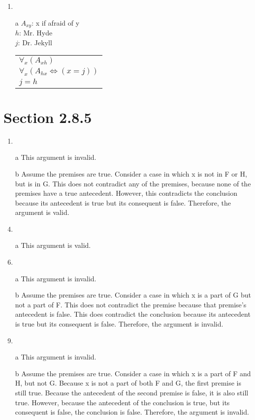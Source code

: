 \documentclass{article}
\begin{document}
\begin{enumerate}
		\item
		\item[a]
			$A_{xy}$: x if afraid of y\\
			$h$: Mr. Hyde\\
			$j$: Dr. Jekyll\\
			\begin{tabular}{l}
				$\forall _x (A_{xh})$\\
				$\forall _x (A_{hx} \iff (x = j))$\\ \hline
				$j = h$
			\end{tabular}

	\end{enumerate}
	\section{Section 2.8.5}
	\begin{enumerate}
		\item
		\item[a] This argument is invalid.
		\item[b] Assume the premises are true. Consider a case in which x is not in F or H, but is in G. This does not contradict any of the premises, because none of the premises have a true antecedent. However, this contradicts the conclusion because its antecedent is true but its consequent is false. Therefore, the argument is valid.
		\item
		\item[a] This argument is valid.
		\item
		\item[a] This argument is invalid.
		\item[b] Assume the premises are true. Consider a case in which x is a part of G but not a part of F. This does not contradict the premise because that premise's antecedent is false. This does contradict the conclusion because its antecedent is true but its consequent is false. Therefore, the argument is invalid.
		\item
		\item[a] This argument is invalid.
		\item[b] Assume the premises are true. Consider a case in which x is a part of F and H, but not G. Because x is not a part of both F and G, the first premise is still true. Because the antecedent of the second premise is false, it is also still true. However, because the antecedent of the conclusion is true, but its consequent is false, the conclusion is false. Therefore, the argument is invalid.
	\end{enumerate}
\end{document}
